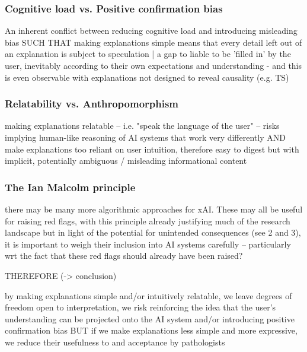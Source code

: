 \subsubsection{Cognitive load vs. Positive confirmation bias}

An inherent conflict between reducing cognitive load and introducing misleading bias
SUCH THAT
making explanations simple means that every detail left out of an explanation is subject to speculation | a gap to liable to be 'filled in' by the user, inevitably according to their own expectations and understanding
- and this is even observable with explanations not designed to reveal causality (e.g. TS)

\subsubsection{Relatability vs. Anthropomorphism}

making explanations relatable -- i.e. "speak the language of the user" -- risks implying human-like reasoning of AI systems that work very differently AND make explanations too reliant on user intuition, therefore easy to digest but with implicit, potentially ambiguous / misleading informational content

\subsubsection{The Ian Malcolm principle}


there may be many more algorithmic approaches for xAI. These may all be useful for raising red flags, with this principle already justifying much of the research landscape but in light of the potential for unintended consequences (see 2 and 3), it is important to weigh their inclusion into AI systems carefully -- particularly wrt the fact that these red flags should already have been raised?

THEREFORE (-> conclusion)

by making explanations simple and/or intuitively relatable, we leave degrees of freedom open to interpretation, we risk reinforcing the idea that the user's understanding can be projected onto the AI system and/or introducing positive confirmation bias 
BUT
if we make explanations less simple and more expressive, we reduce their usefulness to and acceptance by pathologists

